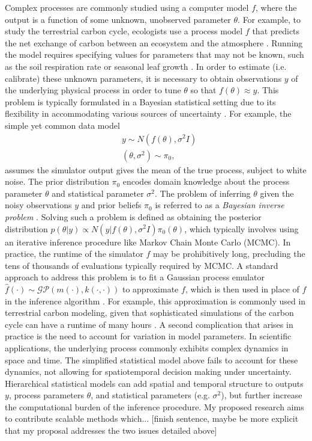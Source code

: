 \documentclass[12pt]{article}
\begin{document}
Complex processes are commonly studied using a computer model $f$, where the output is a function of some unknown, unobserved parameter $\theta$.
For example, to study the terrestrial carbon cycle, ecologists use a process model $f$ 
that predicts the net exchange of carbon between an ecosystem and the atmosphere \cite{Friedlingstein, Waring}. Running the model requires specifying values for parameters that 
may not be known, such as the soil respiration rate or seasonal leaf growth \cite{Fer}. In order to estimate (i.e. calibrate) these unknown parameters, it is necessary to obtain observations $y$ 
of the underlying physical process in order to tune $\theta$ so that $f(\theta) \approx y$. This problem is typically formulated in a Bayesian statistical setting due to its flexibility in accommodating
various sources of uncertainty \cite{Kennedy, Clark}. For example, the simple yet common data model\begin{align*}
&y \sim N(f(\theta), \sigma^2 I) \\
&(\theta, \sigma^2) \sim \pi_0,
\end{align*}
assumes the simulator output gives the mean of the true process, subject to white noise. The prior distribution $\pi_0$ encodes domain knowledge about the 
process parameter $\theta$ and statistical parameter $\sigma^2$. The problem of inferring $\theta$ given the noisy observations $y$ and prior beliefs $\pi_0$ is referred to as a \textit{Bayesian inverse problem} \cite{Stuart}. Solving such a problem is defined 
 as obtaining the posterior distribution $p(\theta|y) \propto N(y|f(\theta), \sigma^2 I)\pi_0(\theta)$, which typically involves using an iterative inference procedure like Markov Chain Monte Carlo (MCMC). In practice, the runtime of the simulator $f$ may be prohibitively long, precluding the tens of thousands of evaluations typically required by MCMC. A standard approach to address this problem is to fit a Gaussian process 
emulator $\hat{f}(\cdot) \sim \mathcal{GP}(m(\cdot), k(\cdot, \cdot))$ to approximate $f$, which is then used in place of $f$ in the inference algorithm \cite{Kennedy, Fer, Cleary}. For example, this approximation is commonly used in terrestrial carbon modeling, given that sophisticated simulations of the carbon cycle can have a runtime of many hours \cite{Fer}. A second complication that arises in practice is the need to account for variation in model
parameters. In scientific applications, the underlying process commonly exhibits complex dynamics in space and time. The simplified statistical model above fails to account
for these dynamics, not allowing for spatiotemporal decision making under uncertainty. Hierarchical statistical models can add spatial and temporal structure
to outputs $y$, process parameters $\theta$, and statistical parameters (e.g. $\sigma^2$), but further increase the computational burden of the inference procedure. My proposed research aims to contribute scalable methods which... [finish sentence, maybe be more explicit that my proposal addresses the two issues detailed above]
 
\end{document}
